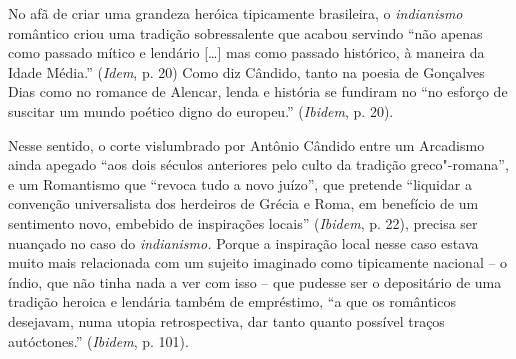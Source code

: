 {No afã de criar uma grandeza heróica tipicamente brasileira, o
\emph{indianismo} romântico criou uma tradição sobressalente que acabou
servindo ``não apenas como passado mítico e lendário [\ldots{}] mas como
passado histórico, à maneira da Idade Média.'' (\emph{Idem}, p. 20) Como
diz Cândido, tanto na poesia de Gonçalves Dias como no romance de
Alencar, lenda e história se fundiram no ``no esforço de suscitar um
mundo poético digno do europeu.'' (\emph{Ibidem}, p. 20).

Nesse sentido, o corte vislumbrado por Antônio Cândido entre um
Arcadismo ainda apegado ``aos dois séculos anteriores pelo culto da
tradição greco"-romana'', e um Romantismo que ``revoca tudo a novo
juízo'', que pretende ``liquidar a convenção universalista dos herdeiros
de Grécia e Roma, em benefício de um sentimento novo, embebido de
inspirações locais'' (\emph{Ibidem}, p. 22), precisa ser nuançado no
caso do \emph{indianismo.} Porque a inspiração local nesse caso estava
muito mais relacionada com um sujeito imaginado como tipicamente
nacional -- o índio, que não tinha nada a ver com isso -- que pudesse
ser o depositário de uma tradição heroica e lendária também de
empréstimo, ``a que os românticos desejavam, numa utopia retrospectiva,
dar tanto quanto possível traços autóctones.'' (\emph{Ibidem}, p. 101).

}

